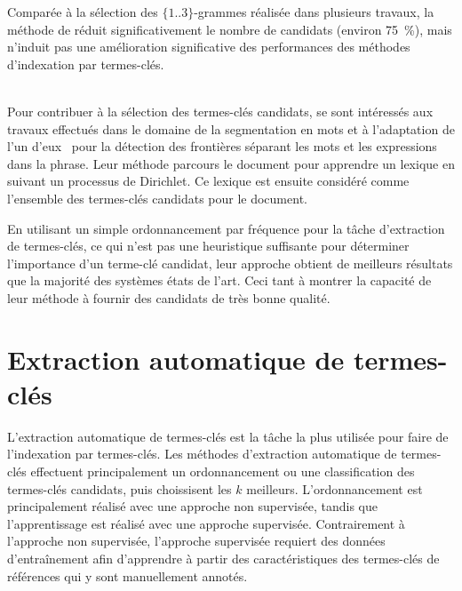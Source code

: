
    Comparée à la sélection des $\{1..3\}$-grammes réalisée dans plusieurs
    travaux, la méthode de  réduit
    significativement le nombre de candidats (environ 75~\%), mais n'induit pas
    une amélioration significative des performances des méthodes d'indexation
    par termes-clés.

    ~\\Pour contribuer à la sélection des termes-clés candidats,
     se sont intéressés aux travaux
    effectués dans le domaine de la segmentation en mots et à l'adaptation de
    l'un d'eux~\cite{goldwater2009bayesianwordsegmentation} pour la détection
    des frontières séparant les mots et les expressions dans la phrase. Leur
    méthode parcours le document pour apprendre un lexique en suivant un
    processus de Dirichlet. Ce lexique est ensuite considéré comme l'ensemble
    des termes-clés candidats pour le document.

    En utilisant un simple ordonnancement par fréquence pour la tâche
    d'extraction de termes-clés, ce qui n'est pas une heuristique suffisante
    pour déterminer l'importance d'un terme-clé candidat, leur approche obtient
    de meilleurs résultats que la majorité des systèmes états de l'art. Ceci
    tant à montrer la capacité de leur méthode à fournir des candidats de très
    bonne qualité.


  \section{Extraction automatique de termes-clés}
  \label{sec:main-state_of_the_art-automatic_keyphrase_extraction}
    L'extraction automatique de termes-clés est la tâche la plus utilisée pour
    faire de l'indexation par termes-clés. Les méthodes d'extraction automatique
    de termes-clés effectuent principalement un ordonnancement ou une
    classification des termes-clés candidats, puis choissisent les $k$
    meilleurs. L'ordonnancement est principalement réalisé avec une approche non
    supervisée, tandis que l'apprentissage est réalisé avec une approche
    supervisée. Contrairement à l'approche non supervisée, l'approche supervisée
    requiert des données d'entraînement afin d'apprendre à partir des
    caractéristiques des termes-clés de références qui y sont manuellement
    annotés.

